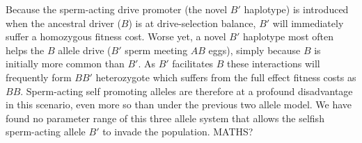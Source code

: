 \documentclass[12pt,letterpaper]{article}
\newcommand{\yb}[1]{{ \color{blue} #1}}
\begin{document}
Because the sperm-acting drive promoter (the novel $B'$ haplotype) is introduced when the ancestral driver ($B$) is at drive-selection balance, 
	$B'$ will immediately suffer a homozygous fitness cost.  
Worse yet, a novel $B'$ haplotype most often helps 
	the $B$  allele drive ($B'$ sperm meeting $AB$ eggs), simply because $B$ is initially more common than $B'$.
As $B'$ facilitates $B$ these interactions will frequently form 
	$BB'$ heterozygote which suffers from the full
	effect fitness costs as $BB$. 
Sperm-acting self promoting alleles are therefore at a profound disadvantage
in this scenario, even more so than under the previous two allele model.
We have found no parameter range of this
three allele system that allows the selfish sperm-acting allele $B'$ to
invade the population. \yb{MATHS?}
\end{document}
